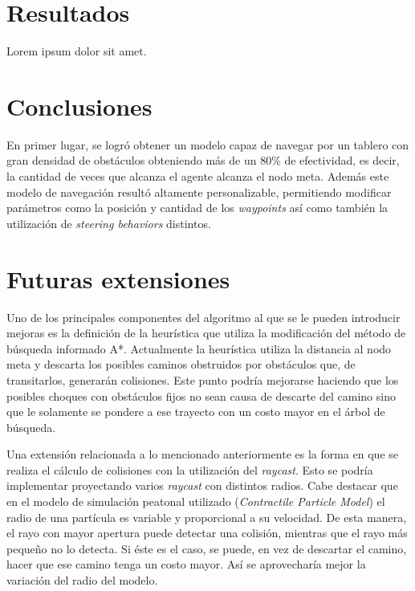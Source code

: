 \documentclass[a4paper,10pt]{article}
\begin{document}

\section{Resultados}

Lorem ipsum dolor sit amet.

\section{Conclusiones}

En primer lugar, se logró obtener un modelo capaz de navegar por un tablero con gran densidad de obstáculos obteniendo más de  un 80\% de efectividad, es decir, la cantidad de veces que alcanza el agente alcanza el nodo meta.
Además este modelo de navegación resultó altamente personalizable, permitiendo modificar parámetros como la posición y cantidad de los \textit{waypoints} así como también la utilización de \textit{steering behaviors} distintos.

\section{Futuras extensiones}

Uno de los principales componentes del algoritmo al que se le pueden introducir mejoras es la definición de la heurística que utiliza la modificación del método de búsqueda informado A*. Actualmente la heurística utiliza la distancia al nodo meta y descarta los posibles caminos obstruidos por obstáculos que, de transitarlos, generarán colisiones. Este punto podría mejorarse haciendo que los posibles choques con obstáculos fijos no sean causa de descarte del camino sino que le solamente se pondere a ese trayecto con un costo mayor en el árbol de búsqueda.

Una extensión relacionada a lo mencionado anteriormente es la forma en que se realiza el cálculo de colisiones con la utilización del \textit{raycast}. Esto se podría implementar proyectando varios \textit{raycast} con distintos radios. Cabe destacar que en el modelo de simulación peatonal utilizado (\textit{Contractile Particle Model}) el radio de una partícula es variable y proporcional a su velocidad. De esta manera, el rayo con mayor apertura puede detectar una colisión, mientras que el rayo más pequeño no lo detecta. Si éste es el caso, se puede, en vez de descartar el camino, hacer que ese camino tenga un costo mayor. Así se aprovecharía mejor la variación del radio del modelo.
\end{document}
